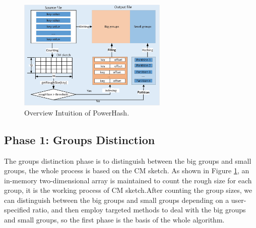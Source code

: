 \begin{figure}[htbp]
\begin{center}
\includegraphics[width=2.8in]{fig/pwhash}
\caption{Overview Intuition of PowerHash.}
\label{fig:pwHash}
\end{center}
\end{figure}





\subsection{Phase 1: Groups Distinction}%

The groups distinction phase is to distinguish between the big groups and small groups, the whole process is based on the CM sketch. As shown in Figure \ref{fig:pwHash}, an in-memory two-dimensional array is maintained to count the rough size for each group, it is the working process of CM sketch.After counting the group sizes, we can distinguish between the big groups and small groups depending on a user-specified ratio, and then employ targeted methods to deal with the big groups and small groups, so the first phase is the basis of the whole algorithm.


